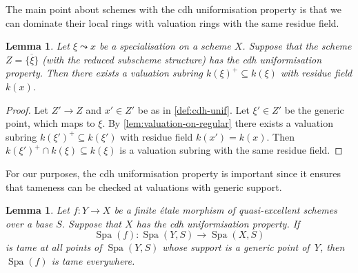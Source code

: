 \documentclass[a4paper,twoside,11pt,reqno]{amsart}
\newcommand{\la}{\longrightarrow}
\DeclareMathOperator{\Spa}{Spa}
\newtheorem{lem}[thm]{Lemma}
\theoremstyle{definition}
\numberwithin{equation}{subsection}
\begin{document}
The main point about schemes with the cdh uniformisation property is that we can dominate their local rings with valuation rings with the same residue field.

\begin{lem} \label{lem:valuation-on-cdh-unif}
    Let $\xi\leadsto x$ be a specialisation on a scheme $X$. Suppose that the scheme $Z = \overline{\{\xi\}}$ (with the reduced subscheme structure) has the cdh uniformisation property. Then there exists a valuation subring $k(\xi)^+\subseteq k(\xi)$ with residue field $k(x)$. 
\end{lem}

\begin{proof}
Let $Z'\to Z$ and $x'\in Z'$ be as in \cref{def:cdh-unif}. Let $\xi'\in Z'$ be the generic point, which maps to $\xi$. By \cref{lem:valuation-on-regular} there exists a valuation subring $k(\xi')^+\subseteq k(\xi')$ with residue field $k(x')=k(x)$. Then $k(\xi')^+\cap k(\xi)\subseteq k(\xi)$ is a valuation subring with the same residue field. 
\end{proof}

For our purposes, the cdh uniformisation property is important since it ensures that tameness can be checked at valuations with generic support.

\begin{lem}  \label{tameness-support-generic-point}
    Let $f\colon Y\to X$ be a finite \'etale  morphism of quasi-excellent schemes over a base $S$. Suppose that $X$ has the cdh uniformisation property. If 
    \[
        \Spa(f) \colon \Spa(Y,S) \la \Spa(X,S)
    \]
    is tame at all points of $\Spa(Y,S)$ whose support is a generic point of~$Y$, then $\Spa(f)$ is tame everywhere.
\end{lem}
\end{document}
